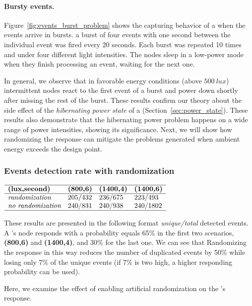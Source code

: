 \paragraph{Bursty events.}
Figure~\ref{fig:events_burst_problem} shows the capturing behavior of a \cis when the events arrive in bursts. a burst of four events with one second between the individual event was fired every 20 seconds. Each burst was repeated 10 times and under four different light intensities. The nodes sleep in a low-power mode when they finish processing an event, waiting for the next one. 

In general, we observe that in favorable energy conditions (above $\SI{500}{lux}$) intermittent nodes react to the first event of a burst and power down shortly after missing the rest of the burst. These results confirm our theory about the side effect of the \textit{hibernating power state} of a \cis (Section~\ref{sec:power_state}). These results also demonstrate that the hibernating power problem happens on a wide range of power intensities, showing its significance. Next, we will show how randomizing the response can mitigate the problems generated when ambient energy exceeds the design point. 

\subsubsection{Events detection rate with randomization}
\begin{table}
	\centering
    $
    \begin{array}{llll}\hline
     \textbf{(lux,second)} & \textbf{(800,6)} & \textbf{(1400,4)} & \textbf{(1400,6)}\\\hline
    \textit{randomization}    & 205/432 &  236/675 & 223/493 \\
    \textit{no randomization} & 240/831 &  240/938 & 240/1802 \\\hline
    \end{array}
    $
    \caption{These results are presented in the following format \textit{unique/total} detected events. A \cis's node responds with a probability equals 65\% in the first two scenarios,\textbf{(800,6)} and \textbf{(1400,4)}, and 30\% for the last one.   
    We can see that Randomizing the response in this way reduces the number of duplicated events by 50\% while losing only 7\% of the unique events (if 7\% is two high, a higher responding probability can be used).}
    \label{tab:regular_rand}
\end{table}
% 
Here, we examine the effect of enabling artificial randomization on the \cis's response. 

